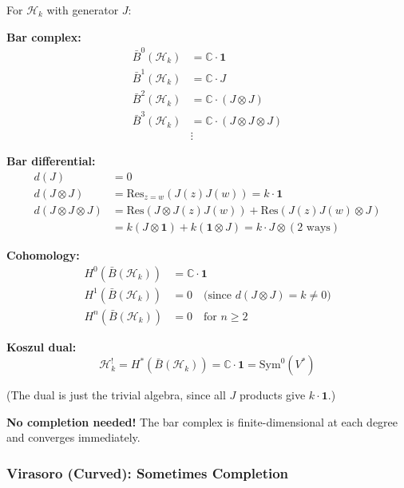 \begin{example}\label{ex:heisenberg-bar-explicit}
For $\mathcal{H}_k$ with generator $J$:

\textbf{Bar complex:}
\begin{align}
\bar{B}^0(\mathcal{H}_k) &= \mathbb{C} \cdot \mathbf{1} \\
\bar{B}^1(\mathcal{H}_k) &= \mathbb{C} \cdot J \\
\bar{B}^2(\mathcal{H}_k) &= \mathbb{C} \cdot (J \otimes J) \\
\bar{B}^3(\mathcal{H}_k) &= \mathbb{C} \cdot (J \otimes J \otimes J) \\
&\vdots
\end{align}

\textbf{Bar differential:}
\begin{align}
d(J) &= 0 \\
d(J \otimes J) &= \text{Res}_{z=w}(J(z)J(w)) = k \cdot \mathbf{1} \\
d(J \otimes J \otimes J) &= \text{Res}(J \otimes J(z)J(w)) + \text{Res}(J(z)J(w) \otimes J) \\
&= k(J \otimes \mathbf{1}) + k(\mathbf{1} \otimes J) = k \cdot J \otimes (2 \text{ ways})
\end{align}

\textbf{Cohomology:}
\begin{align}
H^0(\bar{B}(\mathcal{H}_k)) &= \mathbb{C} \cdot \mathbf{1} \\
H^1(\bar{B}(\mathcal{H}_k)) &= 0 \quad \text{(since $d(J \otimes J) = k \neq 0$)} \\
H^n(\bar{B}(\mathcal{H}_k)) &= 0 \quad \text{for } n \geq 2
\end{align}

\textbf{Koszul dual:}
$$\mathcal{H}_k^! = H^*(\bar{B}(\mathcal{H}_k)) = \mathbb{C} \cdot \mathbf{1} = \text{Sym}^0(V^*)$$

(The dual is just the trivial algebra, since all $J$ products give $k \cdot \mathbf{1}$.)

\textbf{No completion needed!} The bar complex is finite-dimensional at each degree and 
converges immediately.
\end{example}

\subsubsection{Virasoro (Curved): Sometimes Completion}

